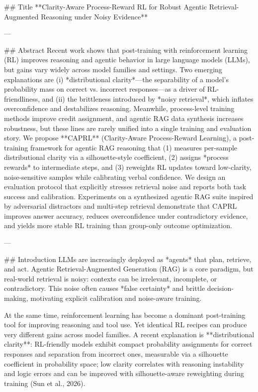 ## Title  
**Clarity-Aware Process-Reward RL for Robust Agentic Retrieval-Augmented Reasoning under Noisy Evidence**

---

## Abstract  
Recent work shows that post-training with reinforcement learning (RL) improves reasoning and agentic behavior in large language models (LLMs), but gains vary widely across model families and settings. Two emerging explanations are (i) *distributional clarity*—the separability of a model’s probability mass on correct vs. incorrect responses—as a driver of RL-friendliness, and (ii) the brittleness introduced by *noisy retrieval*, which inflates overconfidence and destabilizes reasoning. Meanwhile, process-level training methods improve credit assignment, and agentic RAG data synthesis increases robustness, but these lines are rarely unified into a single training and evaluation story.  
We propose **CAPRL** (Clarity-Aware Process-Reward Learning), a post-training framework for agentic RAG reasoning that (1) measures per-sample distributional clarity via a silhouette-style coefficient, (2) assigns *process rewards* to intermediate steps, and (3) reweights RL updates toward low-clarity, noise-sensitive samples while calibrating verbal confidence. We design an evaluation protocol that explicitly stresses retrieval noise and reports both task success and calibration. Experiments on a synthesized agentic RAG suite inspired by adversarial distractors and multi-step retrieval demonstrate that CAPRL improves answer accuracy, reduces overconfidence under contradictory evidence, and yields more stable RL training than group-only outcome optimization.

---

## Introduction  
LLMs are increasingly deployed as *agents* that plan, retrieve, and act. Agentic Retrieval-Augmented Generation (RAG) is a core paradigm, but real-world retrieval is noisy: contexts can be irrelevant, incomplete, or contradictory. This noise often causes *false certainty* and brittle decision-making, motivating explicit calibration and noise-aware training.

At the same time, reinforcement learning has become a dominant post-training tool for improving reasoning and tool use. Yet identical RL recipes can produce very different gains across model families. A recent explanation is **distributional clarity**: RL-friendly models exhibit compact probability assignments for correct responses and separation from incorrect ones, measurable via a silhouette coefficient in probability space; low clarity correlates with reasoning instability and logic errors and can be improved with silhouette-aware reweighting during training (Sun et al., 2026).

